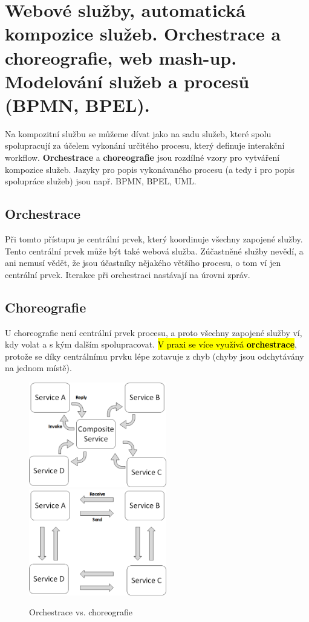 \section[AOS - Kompozice služeb]{Webové služby, automatická kompozice služeb. Orchestrace a choreografie, web mash-up. Modelování služeb a procesů (BPMN, BPEL).}

Na kompozitní službu se můžeme dívat jako na sadu služeb, které spolu spolupracují za účelem vykonání určitého procesu, který definuje interakční workflow. \textbf{Orchestrace} a \textbf{choreografie} jsou rozdílné vzory pro vytváření kompozice služeb. Jazyky pro popis vykonávaného procesu (a tedy i pro popis spolupráce služeb) jsou např. BPMN, BPEL, UML.

\subsection{Orchestrace}
Při tomto přístupu je centrální prvek, který koordinuje všechny zapojené služby. Tento centrální prvek může být také webová služba. Zúčastněné služby nevědí, a ani nemusí vědět, že jsou účastníky nějakého většího procesu, o tom ví jen centrální prvek. Iterakce při orchestraci nastávají na úrovni zpráv.

\subsection{Choreografie}
U choreografie není centrální prvek procesu, a proto všechny zapojené služby ví, kdy volat a s kým dalším spolupracovat. \hl{V praxi se více využívá \textbf{orchestrace}}, protože se díky centrálnímu prvku lépe zotavuje z chyb (chyby jsou odchytávány na jednom místě).

\begin{figure}[h!]
\centering
\includegraphics[width=60mm]{11/images/orche}
\hspace{10px}
\includegraphics[width=60mm]{11/images/choreo}
\caption{Orchestrace vs. choreografie}
\end{figure}

